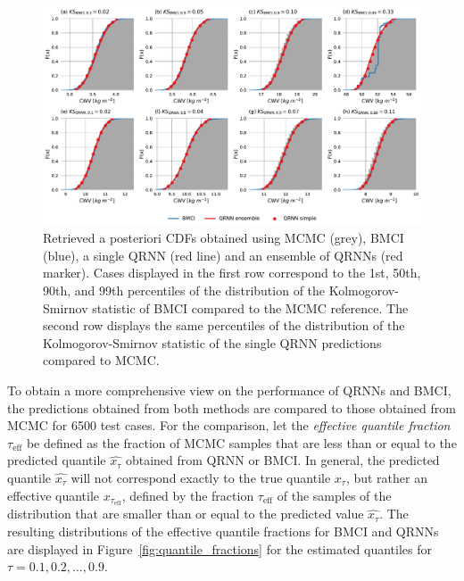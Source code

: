 \documentclass[journal abbreviation, manuscript]{copernicus}
\begin{document}
  \begin{figure}[hbpt!]
    \centering
    \includegraphics[width = 1.0\linewidth]{../plots/fig03}
    \caption{Retrieved a posteriori CDFs obtained using MCMC (grey), BMCI
    (blue), a single QRNN (red line) and an ensemble of QRNNs (red marker). Cases
    displayed in the first row correspond to the 1st, 50th, 90th, and 99th
    percentiles of the distribution of the Kolmogorov-Smirnov statistic of BMCI
    compared to the MCMC reference. The second row displays the same percentiles of
    the distribution of the Kolmogorov-Smirnov statistic of the single QRNN
    predictions compared to MCMC.}
    \label{fig:cdfs}
  \end{figure}

  To obtain a more comprehensive view on the performance of QRNNs and BMCI,
  the predictions obtained from both methods are compared to those obtained
  from MCMC for 6500 test cases. For the comparison, let the \textit{effective
    quantile fraction} $\tau_{\text{eff}}$ be defined as the fraction of MCMC
  samples that are less than or equal to the predicted quantile
  $\widehat{x_\tau}$ obtained from QRNN or BMCI. In general, the predicted
  quantile $\widehat{x_\tau}$ will not correspond exactly to the true quantile
  $x_\tau$, but rather an effective quantile $x_{\tau_\text{eff}}$, defined by
  the fraction $\tau_\text{eff}$ of the samples of the distribution that are
  smaller than or equal to the predicted value $\widehat{x_\tau}$. The
  resulting distributions of the effective quantile fractions for BMCI and
  QRNNs are displayed in Figure~\ref{fig:quantile_fractions} for the estimated
  quantiles for $\tau = 0.1, 0.2, \ldots, 0.9$.
\end{document}

